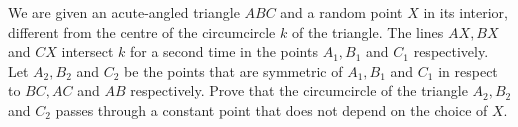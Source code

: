We are given an acute-angled triangle $ABC$ and a random point $X$ in its interior, different from the centre of the circumcircle $k$ of the triangle. The lines $AX,BX$ and $CX$ intersect $k$ for a second time in the points $A_1,B_1$ and $C_1$ respectively. Let $A_2,B_2$ and $C_2$ be the points that are symmetric of  $A_1,B_1$ and $C_1$ in respect to $BC,AC$ and $AB$ respectively. Prove that the circumcircle of the triangle $A_2,B_2$ and $C_2$ passes through a constant point that does not depend on the choice of $X$.